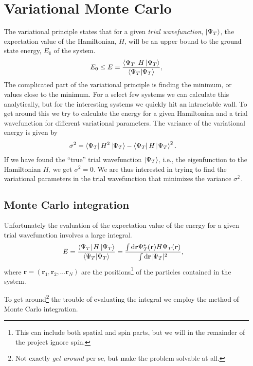 \documentclass[
    a4paper, aps, twocolumn, floatfix, superscriptaddress,
    nofootinbib]{revtex4-1}
\newcommand{\vf}{\mathbf}
\newcommand{\1}{\mathds{1}}
\begin{document}
\section{Variational Monte Carlo}
    The variational principle states that for a given \emph{trial wavefunction},
    $\ket{\Psi_T}$, the expectation value of the Hamiltonian, $H$, will be an
    upper bound to the ground state energy, $E_0$ of the system.
    \begin{align}
        E_0 \leq E
        = \frac{\bra{\Psi_T}H\ket{\Psi_T}}{\bra{\Psi_T}\ket{\Psi_T}},
    \end{align}
    The complicated part of the variational principle is finding the minimum, or
    values close to the minimum. For a select few systems we can calculate this
    analytically, but for the interesting systems we quickly hit an intractable
    wall. To get around this we try to calculate the energy for a given
    Hamiltonian and a trial wavefunction for different variational parameters.
    The variance of the variational energy is given by
    \begin{align}
        \sigma^2
        &=
        \bra{\Psi_T}H^2\ket{\Psi_T}
        - \bra{\Psi_T}H\ket{\Psi_T}^2.
    \end{align}
    If we have found the ``true'' trial wavefunction $\ket{\Psi_T}$, i.e., the
    eigenfunction to the Hamiltonian $H$, we get $\sigma^2 = 0$. We are thus
    interested in trying to find the variational parameters in the trial
    wavefunction that minimizes the variance $\sigma^2$.

    \subsection{Monte Carlo integration}
        Unfortunately the evaluation of the expectation value of the energy for
        a given trial wavefunction involves a large integral.
        \begin{align}
            E
            &= \frac{\bra{\Psi_T}H\ket{\Psi_T}}{\bra{\Psi_T}\ket{\Psi_T}}
            =
            \frac{\int\dd\vf{r}\Psi_T^{*}(\vf{r})H\Psi_T(\vf{r})}
            {\int\dd\vf{r}|\Psi_T|^2},
        \end{align}
        where $\vf{r} = (\vf{r}_1, \vf{r}_2, \dots \vf{r}_N)$ are the
        positions\footnote{This can include both spatial and spin parts, but we
        will in the remainder of the project ignore spin.} of the particles
        contained in the system.

        To get around\footnote{Not exactly \emph{get around} per se, but make
        the problem solvable at all.} the trouble of evaluating the integral we
        employ the method of Monte Carlo integration.
\end{document}
